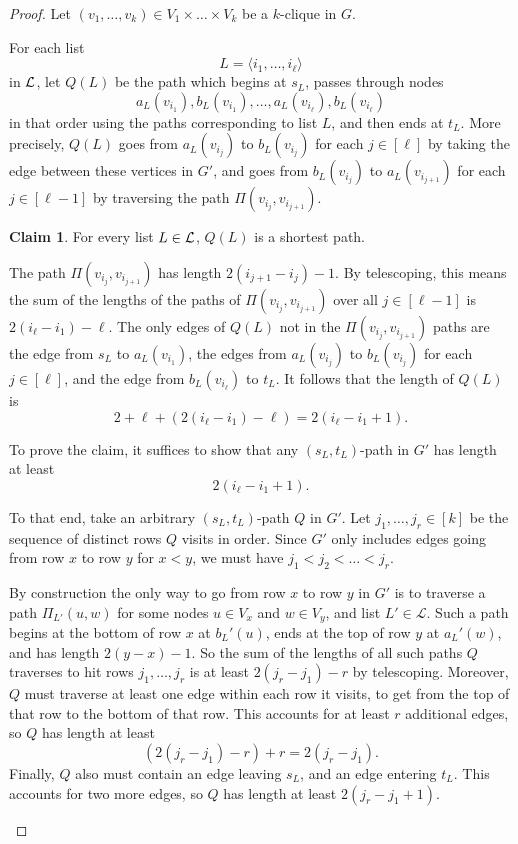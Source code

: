 \documentclass[11pt]{article}
\newcommand{\pair}[1]{\langle #1\rangle}
\theoremstyle{definition}
\newtheorem{claim}[theorem]{Claim}
\begin{document}
    \begin{proof}
        Let $(v_1,\dots,v_k)\in V_1\times\dots\times V_k$ be a $k$-clique in $G$.

        For each list 
        \[L = \pair{i_1, \dots, i_\ell}\] in $\cal{L}$, 
        let $Q(L)$ be the path which begins at $s_L$, passes through nodes         
            \[a_L(v_{i_1}), b_L(v_{i_1}), \dots, a_L(v_{i_\ell}), b_L(v_{i_\ell})\]
        in that order using the paths corresponding to list $L$, and then ends at $t_L$.
        More precisely, $Q(L)$ goes from $a_L(v_{i_j})$ to $b_L(v_{i_j})$ for each $j\in [\ell]$ by taking the edge between these vertices in $G'$, and goes from $b_L(v_{i_j})$ to $a_L(v_{i_{j+1}})$ for each $j\in [\ell-1]$ by traversing the path $\Pi(v_{i_j}, v_{i_{j+1}})$.
        

        \begin{claim}
            \label{claim:Q-are-shortest}
            For every list $L\in \cal{L}$,  $Q(L)$ is a shortest path. 
        \end{claim}
        \begin{claimproof}
            The path $\Pi(v_{i_j}, v_{i_{j+1}})$ has length $2(i_{j+1} - i_j) - 1$.
            By telescoping, this means the sum of the lengths of the paths of $\Pi(v_{i_j}, v_{i_{j+1}})$ over all $j\in [\ell-1]$ is $2(i_{\ell} - i_1) - \ell$.
            The only edges of $Q(L)$  not in the $\Pi(v_{i_j}, v_{i_{j+1}})$ paths are the edge from $s_L$ to $a_L(v_{i_1})$, the edges from $a_L(v_{i_j})$ to $b_L(v_{i_j})$ for each $j\in [\ell]$, and the edge from $b_L(v_{i_\ell})$ to $t_L$.
            It follows that the length of $Q(L)$ is
            \[2 + \ell + \left(2(i_{\ell} - i_1) - \ell\right) = 2(i_{\ell} - i_1 + 1).\] 

            To prove the claim, it suffices to show that any $(s_L,t_L)$-path in $G'$ has length at least \[2(i_\ell - i_1 + 1).\]

            To that end, take an arbitrary $(s_L, t_L)$-path $Q$ in $G'$.
            Let $j_1, \dots, j_r\in [k]$ be the sequence of distinct rows $Q$ visits in order. 
            Since $G'$ only includes edges going from row $x$ to row $y$ for $x < y$, we must have $j_1 < j_2 < \dots < j_r$.

            By construction the only way to go from row $x$ to row $y$ in $G'$ is to traverse a path $\Pi_{L'}(u,w)$ for some nodes $u\in V_x$ and $w\in V_y$, and list $L'\in\mathcal{L}$.
            Such a path begins at the bottom of row $x$ at $b_L'(u)$, ends at the top of row $y$ at $a_L'(w)$, and has length $2(y-x) - 1$.
            So the sum of the lengths of all such paths $Q$ traverses to hit rows $j_1, \dots, j_r$ is at least $2(j_r - j_1) - r$ by telescoping. 
            Moreover, $Q$ must traverse at least one edge within each row it visits, to get from the top of that row to the bottom of that row. 
            This accounts for at least $r$ additional edges, so $Q$ has length at least
                \[\left(2(j_r-j_1) - r\right) + r = 2(j_r - j_1).\]
            Finally, $Q$ also must contain an edge leaving $s_L$, and an edge entering $t_L$.
            This accounts for two more edges, so $Q$ has length at least $2(j_r-j_1+1)$.


\end{claimproof}
\end{proof}
\end{document}
